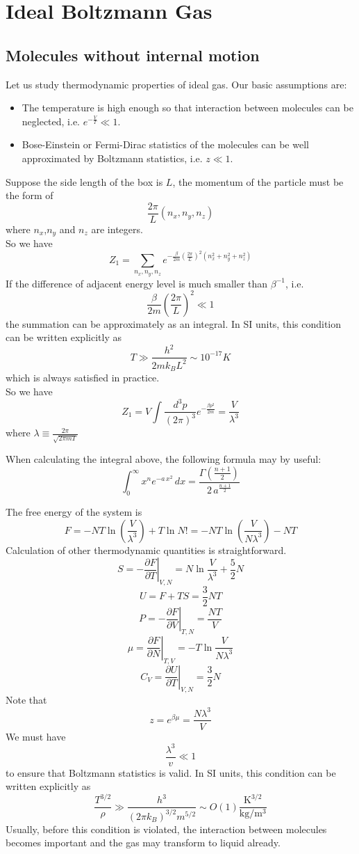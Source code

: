 \documentclass[cyan]{elegantnote}
\begin{document}
\section{Ideal Boltzmann Gas}
\subsection{Molecules without internal motion}
Let us study thermodynamic properties of ideal gas. Our basic assumptions are:
\begin{itemize}
\item The temperature is high enough so that interaction between molecules can be neglected, i.e. $e^{-\frac{V}{T}} \ll 1$.
\item Bose-Einstein or Fermi-Dirac statistics of the molecules can be well approximated by Boltzmann statistics, i.e. $z \ll 1$.
\end{itemize}
Suppose the side length of the box is $L$, the momentum of the particle must be the form of
\[\frac{2\pi}{L}(n_x,n_y,n_z)\]
where $n_x$,$n_y$ and $n_z$ are integers. 
\\
So we have
\[Z_1 = \sum_{n_x,n_y,n_z} e^{-\frac{\beta}{2m} (\frac{2\pi}{L})^2(n_x^2 + n_y^2 + n_z^2)}\]
If the difference of adjacent energy level is much smaller than $\beta^{-1}$, i.e.
\[\frac{\beta}{2m} (\frac{2\pi}{L})^2 \ll 1\] 
the summation can be approximately as an integral. 
In SI units, this condition can be written explicitly as
\[T \gg \frac{h^2}{2mk_BL^2} \sim 10^{-17}K\] 
which is always satisfied in practice. 
\\
So we have
\[Z_1 = V \int \frac{d^3p}{(2\pi)^3} e^{-\frac{\beta p^2}{2m}} = \frac{V}{\lambda^3}\]
where $\lambda \equiv \frac{2\pi}{\sqrt{2\pi m T}}$
\begin{note}
When calculating the integral above, the following formula may by useful: 
\[\int _{0}^{\infty }x^{n}e^{-a\,x^{2}}\,dx={\frac {\Gamma ({\frac {n+1}{2}})}{2\,a^{\frac {n+1}{2}}}}\]
\end{note}
\noindent
The free energy of the system is
\[F = -NT\ln(\frac{V}{\lambda^3}) + T\ln N! = -NT\ln(\frac{V}{N\lambda^3}) - NT\]
Calculation of other thermodynamic quantities is straightforward.
\[S = -\left. \frac{\partial F}{\partial T} \right|_{V,N} = N \ln \frac{V}{\lambda^3} + \frac{5}{2}N\]
\[U = F + TS = \frac{3}{2}NT\]
\[P = -\left. \frac{\partial F}{\partial V} \right|_{T,N} = \frac{NT}{V}\]
\[\mu = \left. \frac{\partial F}{\partial N} \right|_{T,V} = -T \ln \frac{V}{N\lambda^3}\]
\[C_V = \left. \frac{\partial U}{\partial T} \right|_{V,N} = \frac{3}{2}N\]
Note that
\[z = e^{\beta \mu} = \frac{N\lambda^3}{V}\]
We must have
\[\frac{\lambda^3}{v} \ll 1\]
to ensure that Boltzmann statistics is valid. 
In SI units, this condition can be written explicitly as
\[\frac{T^{3/2}}{\rho} \gg \frac{h^3}{(2\pi k_B )^{3/2}m^{5/2}} \sim O(1) \frac{\mathrm{K^{3/2}}}{\mathrm{kg/m^3}}\]
Usually, before this condition is violated, the interaction between molecules becomes important and the gas may transform to liquid already.
\end{document}
